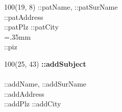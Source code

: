 \documentclass[12pt]{g-brief}
\begin{document}
{
\scriptsize
\begin{textblock}{100}(19, 8) 
\noindent ::patName, ::patSurName\\
::patAddress\\
::patPlz ::patCity\\
\X=.35mm        
\barheight=1cm 
\\
::piz\\
\end{textblock}
}

{

\begin{textblock}{100}(25, 43) 
\noindent 
\textbf{::addSubject} \\\\
::addName, ::addSurName\\
::addAddress\\
::addPlz ::addCity\\
\end{textblock}
}

\newcommand{\Top}{\rule{0pt}{2.6ex}}       %
\newcommand{\Bot}{\rule[-1.2ex]{0pt}{0pt}} %

\newcommand*{\srule}[2][0pt]{\setbox0\hbox{#2}\rule[#1]{\wd0}{0.4pt}}


\makeatletter
\newcommand{\cellwidth}{\TX@col@width}
\makeatother

\end{document}
